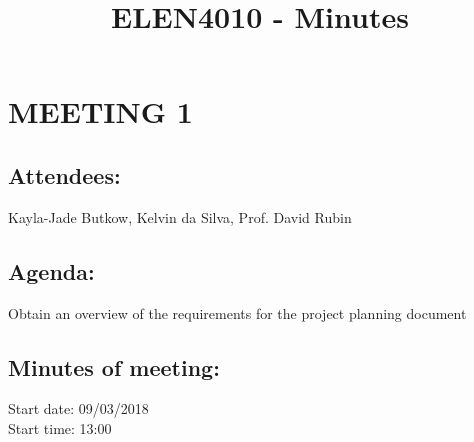 \documentclass[10pt,onecolumn]{witseiepaper}
\title{ELEN4010 - Minutes}
\author{}
\begin{document}
\maketitle
\pagestyle{plain}
\setcounter{page}{1}

\section*{MEETING 1}
\subsection*{Attendees:}
Kayla-Jade Butkow, Kelvin da Silva, Prof. David Rubin
\subsection*{Agenda:} 
Obtain an overview of the requirements for the project planning document

\subsection*{Minutes of meeting:}
Start date: 09/03/2018 \\
Start time: 13:00
\end{document}
